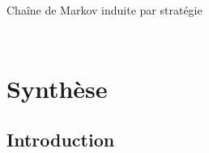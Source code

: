 \documentclass[compress]{beamer}
\theoremstyle{theorem}%
\begin{document}
\begin{frame}{Chaîne de Markov induite par stratégie}
\begin{itemize}
\begin{columns}
\begin{column}{0.5\linewidth}
\begin{figure}
    \end{figure}
  \end{column}
\end{columns}
\end{itemize}
\end{frame}


\section{Synthèse}

\subsection{Introduction}
\end{document}
